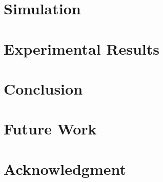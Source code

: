 \documentclass[conference]{IEEEtran}
\begin{document}
\section{Simulation}

\section{Experimental Results} %

\section{Conclusion} %

\section{Future Work} %

\section*{Acknowledgment}

\begin{thebibliography}{1}
\bibitem{}
\end{thebibliography}
\end{document}
